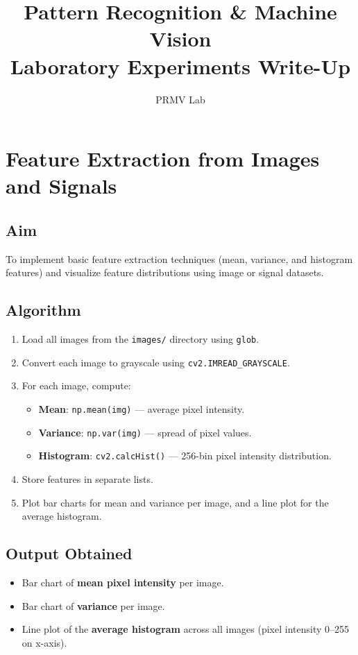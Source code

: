 \documentclass[12pt,a4paper]{article}
\title{\textbf{Pattern Recognition \& Machine Vision}\\[0.5em]
\large Laboratory Experiments Write-Up}
\author{PRMV Lab}
\date{}
\begin{document}
\maketitle
\tableofcontents
\newpage

\section{Feature Extraction from Images and Signals}

\subsection*{Aim}
To implement basic feature extraction techniques (mean, variance, and histogram features)
and visualize feature distributions using image or signal datasets.

\subsection*{Algorithm}
\begin{enumerate}[leftmargin=*, label=\arabic*.]
  \item Load all images from the \texttt{images/} directory using \texttt{glob}.
  \item Convert each image to grayscale using \texttt{cv2.IMREAD\_GRAYSCALE}.
  \item For each image, compute:
    \begin{itemize}
      \item \textbf{Mean}: \texttt{np.mean(img)} — average pixel intensity.
      \item \textbf{Variance}: \texttt{np.var(img)} — spread of pixel values.
      \item \textbf{Histogram}: \texttt{cv2.calcHist()} — 256-bin pixel intensity distribution.
    \end{itemize}
  \item Store features in separate lists.
  \item Plot bar charts for mean and variance per image, and a line plot for the average histogram.
\end{enumerate}

\subsection*{Output Obtained}
\begin{itemize}
  \item Bar chart of \textbf{mean pixel intensity} per image.
  \item Bar chart of \textbf{variance} per image.
  \item Line plot of the \textbf{average histogram} across all images (pixel intensity 0--255 on x-axis).
\end{itemize}
\end{document}
